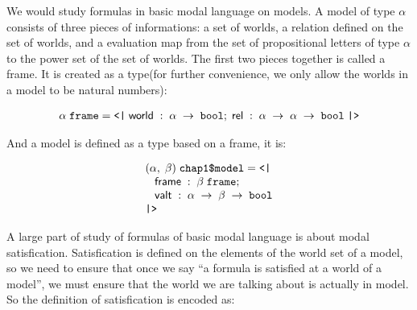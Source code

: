 \documentclass[letterpaper]{article}
\newenvironment{holmath}{\begin{displaymath}\begin{array}{l}}{\end{array}\end{displaymath}\ignorespacesafterend}
\begin{document}
We would study formulas in basic modal language on models. A model of type $\alpha$ consists of three pieces of informations: a set of worlds, a relation defined on the set of worlds, and a evaluation map from the set of propositional letters of type $\alpha$ to the power set of the set of worlds. The first two pieces together is called a frame. It is created as a type(for further convenience, we only allow the worlds in a model to be natural numbers):

\begin{holmath}
  \ensuremath{\alpha}\;\HOLTyOp{frame} = \HOLTokenLeftrec{}\;\HOLFieldName{world}\;:\;\ensuremath{\alpha}\;\ensuremath{\rightarrow}\;\HOLTyOp{bool};\;\HOLFieldName{rel}\;:\;\ensuremath{\alpha}\;\ensuremath{\rightarrow}\;\ensuremath{\alpha}\;\ensuremath{\rightarrow}\;\HOLTyOp{bool}\;\HOLTokenRightrec{}
\end{holmath}

And a model is defined as a type based on a frame, it is:

\begin{holmath}
  (\ensuremath{\alpha},\;\ensuremath{\beta})\;\HOLTyOp{chap1\$model} = \HOLTokenLeftrec{}\\
\;\;\;\HOLFieldName{frame}\;:\;\ensuremath{\beta}\;\HOLTyOp{frame};\\
\;\;\;\HOLFieldName{valt}\;:\;\ensuremath{\alpha}\;\ensuremath{\rightarrow}\;\ensuremath{\beta}\;\ensuremath{\rightarrow}\;\HOLTyOp{bool}\\
\HOLTokenRightrec{}
\end{holmath}

A large part of study of formulas of basic modal language is about modal satisfication. Satisfication is defined on the elements of the world set of a model, so we need to ensure that once we say ``a formula is satisfied at a world of a model'', we must ensure that the world we are talking about is actually in model. So the definition of satisfication is encoded as:
\end{document}
